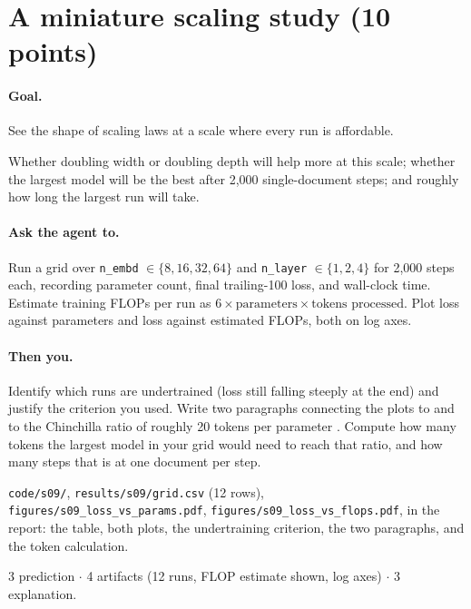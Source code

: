 \documentclass[11pt,letterpaper]{article}
\newcommand{\agent}[1]{\paragraph{Ask the agent to.} #1}
\newcommand{\you}[1]{\paragraph{Then you.} #1}
\newcommand{\goal}[1]{\paragraph{Goal.} #1}
\begin{document}
\section{A miniature scaling study \hfill (10 points)}
\goal{See the shape of scaling laws at a scale where every run is affordable.}
\begin{predict}
Whether doubling width or doubling depth will help more at this scale; whether the largest model will be the best after 2{,}000 single-document steps; and roughly how long the largest run will take.
\end{predict}
\agent{Run a grid over \texttt{n\_embd} $\in\{8,16,32,64\}$ and \texttt{n\_layer} $\in\{1,2,4\}$ for 2{,}000 steps each, recording parameter count, final trailing-100 loss, and wall-clock time. Estimate training FLOPs per run as $6 \times \text{parameters} \times \text{tokens processed}$. Plot loss against parameters and loss against estimated FLOPs, both on log axes.}
\you{Identify which runs are undertrained (loss still falling steeply at the end) and justify the criterion you used. Write two paragraphs connecting the plots to \textcite{kaplan2020scaling} and to the Chinchilla ratio of roughly 20 tokens per parameter \parencite{hoffmann2022chinchilla}. Compute how many tokens the largest model in your grid would need to reach that ratio, and how many steps that is at one document per step.}
\begin{deliver}
\texttt{code/s09/}, \texttt{results/s09/grid.csv} (12 rows), \texttt{figures/s09\_loss\_vs\_params.pdf}, \texttt{figures/s09\_loss\_vs\_flops.pdf}, in the report: the table, both plots, the undertraining criterion, the two paragraphs, and the token calculation.
\end{deliver}
\begin{rubric}3 prediction $\cdot$ 4 artifacts (12 runs, FLOP estimate shown, log axes) $\cdot$ 3 explanation.\end{rubric}

\end{document}

